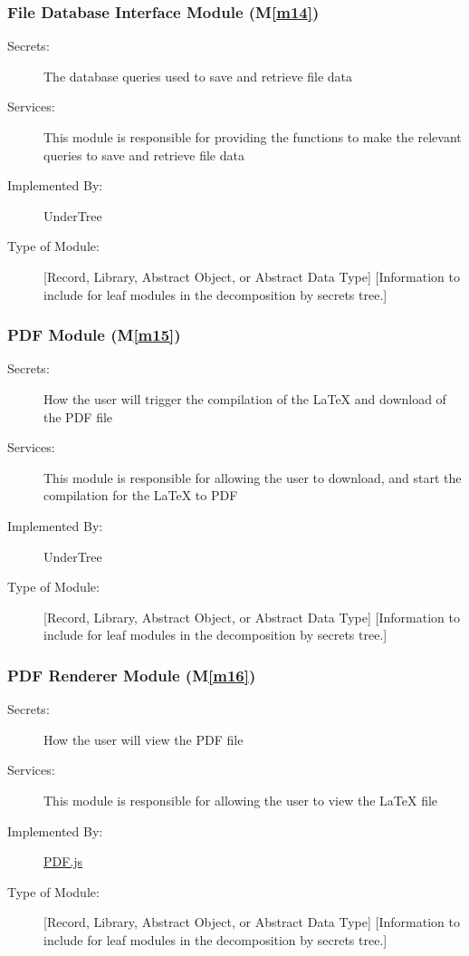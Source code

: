 \documentclass[12pt, titlepage]{article}
\newcommand{\mref}[1]{M\ref{#1}}
\begin{document}
	\subsubsection{File Database Interface Module (\mref{m14})}
	
	\begin{description}
		\item[Secrets:] The database queries used to save and retrieve file data
		\item[Services:] This module is responsible for providing the functions to make the relevant queries to save and retrieve file data
		\item[Implemented By:] UnderTree
		\item[Type of Module:] [Record, Library, Abstract Object, or Abstract Data Type]
		[Information to include for leaf modules in the decomposition by secrets tree.]
	\end{description}
	
	\subsubsection{PDF Module (\mref{m15})}
	
	\begin{description}
		\item[Secrets:] How the user will trigger the compilation of the LaTeX and download of the PDF file
		\item[Services:] This module is responsible for allowing the user to download, and start the compilation for the LaTeX to PDF
		\item[Implemented By:] UnderTree
		\item[Type of Module:] [Record, Library, Abstract Object, or Abstract Data Type]
		[Information to include for leaf modules in the decomposition by secrets tree.]
	\end{description}
	
	\subsubsection{PDF Renderer Module (\mref{m16})}
	
	\begin{description}
		\item[Secrets:] How the user will view the PDF file
		\item[Services:] This module is responsible for allowing the user to view the LaTeX file
		\item[Implemented By:] \href{https://mozilla.github.io/pdf.js/examples/}{PDF.js}
		\item[Type of Module:] [Record, Library, Abstract Object, or Abstract Data Type]
		[Information to include for leaf modules in the decomposition by secrets tree.]
	\end{description}
	
\end{document}
